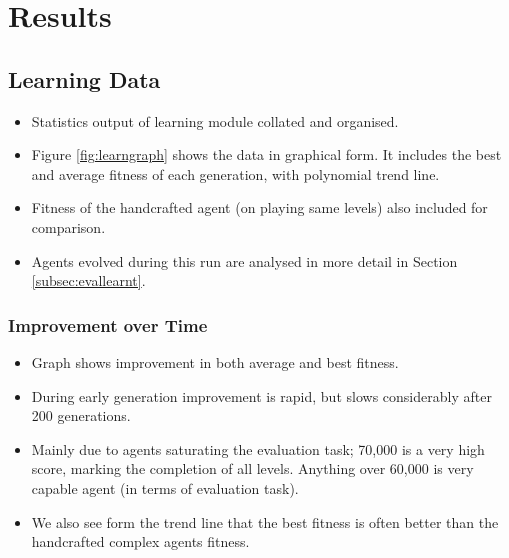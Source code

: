 
\section{Results}


\subsection{Learning Data}


\begin{itemize}
\item Statistics output of learning module collated and organised.
\item Figure \ref{fig:learngraph} shows the data in graphical form. It includes the best and average fitness of each generation, with polynomial trend line.
\item Fitness of the handcrafted agent (on playing same levels) also included for comparison.
\item Agents evolved during this run are analysed in more detail in Section \ref{subsec:evallearnt}.
\end{itemize}

\subsubsection{Improvement over Time}

\begin{itemize}
\item Graph shows improvement in both average and best fitness.
\item During early generation improvement is rapid, but slows considerably after 200 generations.
\item Mainly due to agents saturating the evaluation task; 70,000 is a very high score, marking the completion of all levels. Anything over 60,000 is very capable agent (in terms of evaluation task).
\item We also see form the trend line that the best fitness is often better than the handcrafted complex agents fitness.
\end{itemize}

